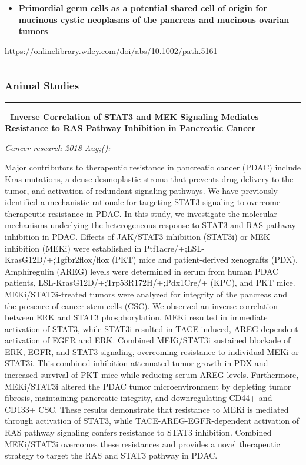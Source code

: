 \documentclass[]{article}
\providecommand{\tightlist}{%
  \setlength{\itemsep}{0pt}\setlength{\parskip}{0pt}}
\begin{document}
\begin{itemize}
\tightlist
\item
  \textbf{Primordial germ cells as a potential shared cell of origin for
  mucinous cystic neoplasms of the pancreas and mucinous ovarian tumors}
\end{itemize}

\url{https://onlinelibrary.wiley.com/doi/abs/10.1002/path.5161}

\begin{center}\rule{0.5\linewidth}{\linethickness}\end{center}

\hypertarget{animal-studies}{%
\subsubsection{Animal Studies}\label{animal-studies}}

\begin{center}\rule{0.5\linewidth}{\linethickness}\end{center}

 - \textbf{Inverse Correlation of STAT3 and MEK Signaling Mediates
Resistance to RAS Pathway Inhibition in Pancreatic Cancer}

\emph{Cancer research 2018 Aug;():}

Major contributors to therapeutic resistance in pancreatic cancer (PDAC)
include Kras mutations, a dense desmoplastic stroma that prevents drug
delivery to the tumor, and activation of redundant signaling pathways.
We have previously identified a mechanistic rationale for targeting
STAT3 signaling to overcome therapeutic resistance in PDAC. In this
study, we investigate the molecular mechanisms underlying the
heterogeneous response to STAT3 and RAS pathway inhibition in PDAC.
Effects of JAK/STAT3 inhibition (STAT3i) or MEK inhibition (MEKi) were
established in Ptf1acre/+;LSL-KrasG12D/+;Tgfbr2flox/flox (PKT) mice and
patient-derived xenografts (PDX). Amphiregulin (AREG) levels were
determined in serum from human PDAC patients,
LSL-KrasG12D/+;Trp53R172H/+;Pdx1Cre/+ (KPC), and PKT mice.
MEKi/STAT3i-treated tumors were analyzed for integrity of the pancreas
and the presence of cancer stem cells (CSC). We observed an inverse
correlation between ERK and STAT3 phosphorylation. MEKi resulted in
immediate activation of STAT3, while STAT3i resulted in TACE-induced,
AREG-dependent activation of EGFR and ERK. Combined MEKi/STAT3i
sustained blockade of ERK, EGFR, and STAT3 signaling, overcoming
resistance to individual MEKi or STAT3i. This combined inhibition
attenuated tumor growth in PDX and increased survival of PKT mice while
reducing serum AREG levels. Furthermore, MEKi/STAT3i altered the PDAC
tumor microenvironment by depleting tumor fibrosis, maintaining
pancreatic integrity, and downregulating CD44+ and CD133+ CSC. These
results demonstrate that resistance to MEKi is mediated through
activation of STAT3, while TACE-AREG-EGFR-dependent activation of RAS
pathway signaling confers resistance to STAT3 inhibition. Combined
MEKi/STAT3i overcomes these resistances and provides a novel therapeutic
strategy to target the RAS and STAT3 pathway in PDAC.
\end{document}
